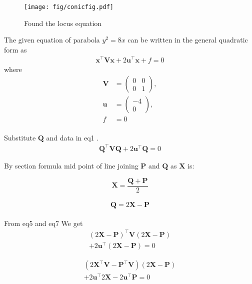 \documentclass[journal,12pt,twocolumn]{article}
\newcommand{\myvec}[1]{\ensuremath{\begin{pmatrix}#1\end{pmatrix}}}
\let\vec\mathbf
\begin{document}
\begin{figure}[h]
    \centering
\texttt{[image: fig/conicfig.pdf]}
    \caption{Found the locus equation }
    \label{fig:my_label}
\end{figure}
\vspace{0cm}
The given equation of parabola $y^2 = 8x$ can be written in the general quadratic form as
\begin{align}
    \label{eq:conic_quad_form}
    \vec{x}^{\top}\vec{V}\vec{x}+2\vec{u}^{\top}\vec{x}+f=0
    \end{align}
where
\begin{align}
	\label{eq:V_matrix}
	\vec{V} &= \myvec{0 & 0\\0 & 1},
	\\
	\label{eq:u_vector}
	\vec{u} &= \myvec{-4\\0},
	\\
	\label{eq:f_value}
	f &= 0
\end{align}
\\
Substitute $\vec{Q}$ and data in eq1 .
\\
\begin{align}
    \label{eq:conic_quad_form}
    \vec{Q}^{\top}\vec{V}\vec{Q}+2\vec{u}^{\top}\vec{Q}=0
    \end{align}

By section formula
mid point of line joining $\vec{P}$ and $\vec{Q}$ as $\vec{X}$ is:
 
 \begin{equation}
	\vec{X}=\frac{\vec{Q}+\vec{P}}{2}
	 \label{eq-4}
\end{equation}
\\
 \begin{equation}
	\vec{Q}=2\vec{X}-\vec{P}
	 \label{eq-4}
\end{equation}
\\
From eq5 and eq7 We get 
\\

\begin{multline}
    (2\vec{X}-\vec{P})^{\top}\vec{V}(2\vec{X}-\vec{P})\\+2\vec{u}^{\top}(2\vec{X}-\vec{P})=0
     \label{eq-5}
    \end{multline}

\begin{multline}
    \label{eq:conic_quad_form}
    (2\vec{X}^{\top}\vec{V}-\vec{P}^{\top}\vec{V})(2\vec{X}-\vec{P})\\+2\vec{u}^{\top}2\vec{X}-2\vec{u}^{\top}\vec{P}=0
    \end{multline}
\end{document}
